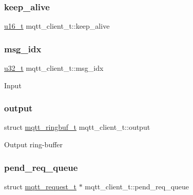 \subsubsection{\texorpdfstring{keep\+\_\+alive}{keep\_alive}}
{\footnotesize\ttfamily \hyperlink{group__compiler__abstraction_ga77570ac4fcab86864fa1916e55676da2}{u16\+\_\+t} mqtt\+\_\+client\+\_\+t\+::keep\+\_\+alive}

\mbox{\label{structmqtt__client__t_a88fdc82ad31ecb15e4adaeb5363c3ca1}} 
\subsubsection{\texorpdfstring{msg\+\_\+idx}{msg\_idx}}
{\footnotesize\ttfamily \hyperlink{group__compiler__abstraction_ga4c14294869aceba3ef9d4c0c302d0f33}{u32\+\_\+t} mqtt\+\_\+client\+\_\+t\+::msg\+\_\+idx}

Input \mbox{\label{structmqtt__client__t_a99a47e18b78a99284ec7a568172093e2}} 
\subsubsection{\texorpdfstring{output}{output}}
{\footnotesize\ttfamily struct \hyperlink{structmqtt__ringbuf__t}{mqtt\+\_\+ringbuf\+\_\+t} mqtt\+\_\+client\+\_\+t\+::output}

Output ring-\/buffer \mbox{\label{structmqtt__client__t_a0a9d32364175d04db989c99f8e91f982}} 
\subsubsection{\texorpdfstring{pend\+\_\+req\+\_\+queue}{pend\_req\_queue}}
{\footnotesize\ttfamily struct \hyperlink{structmqtt__request__t}{mqtt\+\_\+request\+\_\+t} $\ast$ mqtt\+\_\+client\+\_\+t\+::pend\+\_\+req\+\_\+queue}

